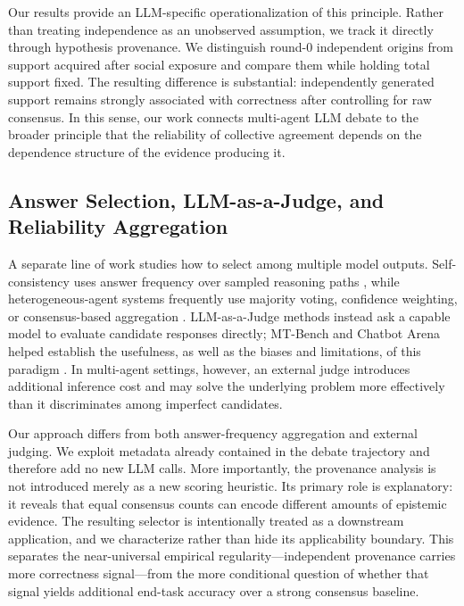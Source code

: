 Our results provide an LLM-specific operationalization of this principle. Rather than treating independence as an unobserved assumption, we track it directly through hypothesis provenance. We distinguish round-$0$ independent origins from support acquired after social exposure and compare them while holding total support fixed. The resulting difference is substantial: independently generated support remains strongly associated with correctness after controlling for raw consensus. In this sense, our work connects multi-agent LLM debate to the broader principle that the reliability of collective agreement depends on the dependence structure of the evidence producing it.

\subsection{Answer Selection, LLM-as-a-Judge, and Reliability Aggregation}
\label{subsec:rw_selection}

A separate line of work studies how to select among multiple model outputs. Self-consistency uses answer frequency over sampled reasoning paths \cite{wang2023selfconsistency}, while heterogeneous-agent systems frequently use majority voting, confidence weighting, or consensus-based aggregation \cite{chen2024reconcile,estornell2024multillm}. LLM-as-a-Judge methods instead ask a capable model to evaluate candidate responses directly; MT-Bench and Chatbot Arena helped establish the usefulness, as well as the biases and limitations, of this paradigm \cite{zheng2023judging}. In multi-agent settings, however, an external judge introduces additional inference cost and may solve the underlying problem more effectively than it discriminates among imperfect candidates.

Our approach differs from both answer-frequency aggregation and external judging. We exploit metadata already contained in the debate trajectory and therefore add no new LLM calls. More importantly, the provenance analysis is not introduced merely as a new scoring heuristic. Its primary role is explanatory: it reveals that equal consensus counts can encode different amounts of epistemic evidence. The resulting selector is intentionally treated as a downstream application, and we characterize rather than hide its applicability boundary. This separates the near-universal empirical regularity---independent provenance carries more correctness signal---from the more conditional question of whether that signal yields additional end-task accuracy over a strong consensus baseline.

